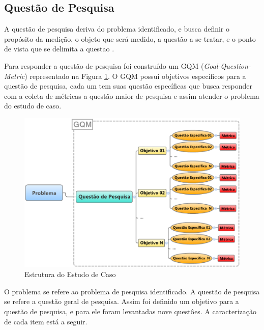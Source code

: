 \subsection{Questão de Pesquisa}
A questão de pesquisa deriva do problema identificado, e busca definir o propósito da medição, o objeto que será medido, a questão a se tratar, e o ponto de vista que se delimita a questao \cite{Basili96b}.

Para responder a questão de pesquisa foi construído um GQM (\textit{Goal-Question-Metric}) \cite{Basili96b} representado na Figura \ref{fig:estrut-est-caso}. O GQM possui objetivos específicos para a questão de pesquisa, cada um tem suas questão específicas que busca responder com a coleta de métricas a questão maior de pesquisa e assim atender o problema do estudo de caso. 


\begin{figure}[h!]
\centering
\includegraphics[keepaspectratio=false,scale=0.53]{figuras/figuras_pedro/estrut-estudo-caso.eps}
\caption{Estrutura do Estudo de Caso}
\label{fig:estrut-est-caso}
\end{figure}
\FloatBarrier


O problema se refere ao problema de pesquisa identificado. A questão de pesquisa se refere a questão geral de pesquisa. Assim foi definido um objetivo para a questão de pesquisa, e para ele foram levantadas nove questôes. A caracterização de cada item está a seguir.


